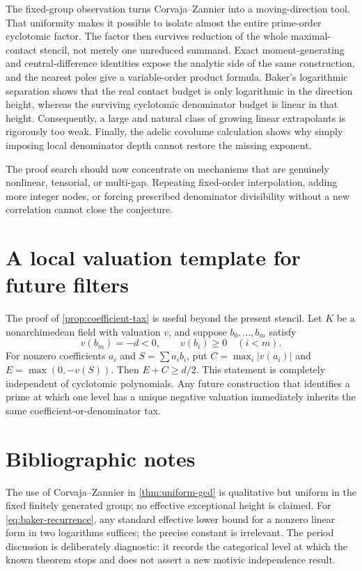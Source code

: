 \documentclass[11pt]{article}
\theoremstyle{definition}
\begin{document}
The fixed-group observation turns Corvaja--Zannier into a moving-direction
tool.  That uniformity makes it possible to isolate almost the entire
prime-order cyclotomic factor.  The factor then survives reduction of the
whole maximal-contact stencil, not merely one unreduced summand.  Exact
moment-generating and central-difference identities expose the analytic side
of the same construction, and the nearest poles give a variable-order product
formula.  Baker's logarithmic separation shows that the real contact budget
is only logarithmic in the direction height, whereas the surviving
cyclotomic denominator budget is linear in that height.  Consequently, a
large and natural class of growing linear extrapolants is rigorously too weak.
Finally, the adelic covolume calculation shows why simply imposing local
denominator depth cannot restore the missing exponent.

The proof search should now concentrate on mechanisms that are genuinely
nonlinear, tensorial, or multi-gap.  Repeating fixed-order interpolation,
adding more integer nodes, or forcing prescribed denominator divisibility
without a new correlation cannot close the conjecture.

\appendix

\section{A local valuation template for future filters}
\label{app:valuation-template}

The proof of \cref{prop:coefficient-tax} is useful beyond the present
stencil.  Let $K$ be a nonarchimedean field with valuation $v$, and suppose
$b_0,\ldots,b_m$ satisfy
\[
 v(b_m)=-d<0,\qquad v(b_i)\ge0\quad(i<m).
\]
For nonzero coefficients $a_i$ and $S=\sum a_ib_i$, put
$C=\max_i|v(a_i)|$ and $E=\max(0,-v(S))$.  Then $E+C\ge d/2$.
This statement is completely independent of cyclotomic polynomials.  Any
future construction that identifies a prime at which one level has a unique
negative valuation immediately inherits the same coefficient-or-denominator
tax.

\section{Bibliographic notes}

The use of Corvaja--Zannier in \cref{thm:uniform-gcd} is qualitative but
uniform in the fixed finitely generated group; no effective exceptional
height is claimed.  For \eqref{eq:baker-recurrence}, any standard effective
lower bound for a nonzero linear form in two logarithms suffices; the precise
constant is irrelevant.  The period discussion is deliberately diagnostic:
it records the categorical level at which the known theorem stops and does
not assert a new motivic independence result.
\end{document}
